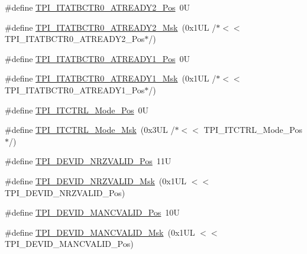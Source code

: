 \begin{DoxyCompactItemize}
\item 
\#define \mbox{\hyperlink{group___c_m_s_i_s___t_p_i_ga3f0249dfcfd58090c08fd4a0adea6b22}{T\+P\+I\+\_\+\+I\+T\+A\+T\+B\+C\+T\+R0\+\_\+\+A\+T\+R\+E\+A\+D\+Y2\+\_\+\+Pos}}~0U
\item 
\#define \mbox{\hyperlink{group___c_m_s_i_s___t_p_i_gaf985067de6e6e68fbbd2350646b9125e}{T\+P\+I\+\_\+\+I\+T\+A\+T\+B\+C\+T\+R0\+\_\+\+A\+T\+R\+E\+A\+D\+Y2\+\_\+\+Msk}}~(0x1\+U\+L /$\ast$$<$$<$ T\+P\+I\+\_\+\+I\+T\+A\+T\+B\+C\+T\+R0\+\_\+\+A\+T\+R\+E\+A\+D\+Y2\+\_\+\+Pos$\ast$/)
\item 
\#define \mbox{\hyperlink{group___c_m_s_i_s___t_p_i_gaded82241155665db59493d912d44c65c}{T\+P\+I\+\_\+\+I\+T\+A\+T\+B\+C\+T\+R0\+\_\+\+A\+T\+R\+E\+A\+D\+Y1\+\_\+\+Pos}}~0U
\item 
\#define \mbox{\hyperlink{group___c_m_s_i_s___t_p_i_ga21e1f9c5532e75ee2edc8eb4cf69b1f0}{T\+P\+I\+\_\+\+I\+T\+A\+T\+B\+C\+T\+R0\+\_\+\+A\+T\+R\+E\+A\+D\+Y1\+\_\+\+Msk}}~(0x1\+U\+L /$\ast$$<$$<$ T\+P\+I\+\_\+\+I\+T\+A\+T\+B\+C\+T\+R0\+\_\+\+A\+T\+R\+E\+A\+D\+Y1\+\_\+\+Pos$\ast$/)
\item 
\#define \mbox{\hyperlink{group___c_m_s_i_s___t_p_i_gaa847adb71a1bc811d2e3190528f495f0}{T\+P\+I\+\_\+\+I\+T\+C\+T\+R\+L\+\_\+\+Mode\+\_\+\+Pos}}~0U
\item 
\#define \mbox{\hyperlink{group___c_m_s_i_s___t_p_i_gad6f87550b468ad0920d5f405bfd3f017}{T\+P\+I\+\_\+\+I\+T\+C\+T\+R\+L\+\_\+\+Mode\+\_\+\+Msk}}~(0x3\+U\+L /$\ast$$<$$<$ T\+P\+I\+\_\+\+I\+T\+C\+T\+R\+L\+\_\+\+Mode\+\_\+\+Pos$\ast$/)
\item 
\#define \mbox{\hyperlink{group___c_m_s_i_s___t_p_i_ga9f46cf1a1708575f56d6b827766277f4}{T\+P\+I\+\_\+\+D\+E\+V\+I\+D\+\_\+\+N\+R\+Z\+V\+A\+L\+I\+D\+\_\+\+Pos}}~11U
\item 
\#define \mbox{\hyperlink{group___c_m_s_i_s___t_p_i_gacecc8710a8f6a23a7d1d4f5674daf02a}{T\+P\+I\+\_\+\+D\+E\+V\+I\+D\+\_\+\+N\+R\+Z\+V\+A\+L\+I\+D\+\_\+\+Msk}}~(0x1\+U\+L $<$$<$ T\+P\+I\+\_\+\+D\+E\+V\+I\+D\+\_\+\+N\+R\+Z\+V\+A\+L\+I\+D\+\_\+\+Pos)
\item 
\#define \mbox{\hyperlink{group___c_m_s_i_s___t_p_i_ga675534579d9e25477bb38970e3ef973c}{T\+P\+I\+\_\+\+D\+E\+V\+I\+D\+\_\+\+M\+A\+N\+C\+V\+A\+L\+I\+D\+\_\+\+Pos}}~10U
\item 
\#define \mbox{\hyperlink{group___c_m_s_i_s___t_p_i_ga4c3ee4b1a34ad1960a6b2d6e7e0ff942}{T\+P\+I\+\_\+\+D\+E\+V\+I\+D\+\_\+\+M\+A\+N\+C\+V\+A\+L\+I\+D\+\_\+\+Msk}}~(0x1\+U\+L $<$$<$ T\+P\+I\+\_\+\+D\+E\+V\+I\+D\+\_\+\+M\+A\+N\+C\+V\+A\+L\+I\+D\+\_\+\+Pos)
\item 

\end{DoxyCompactItemize}
